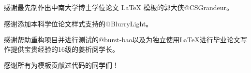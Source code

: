 \begin{acknowledgements} 

感谢最先制作出中南大学博士学位论文 LaTeX 模板的郭大侠@CSGrandeur。

感谢添加本科学位论文样式支持的@BlurryLight。

感谢帮助重构项目并进行测试的@burst-bao以及为独立使用LaTeX进行毕业论文写作提供宝贵经验的16级的姜析阅学长。

感谢所有为模板贡献过代码的同学们！

\end{acknowledgements}
